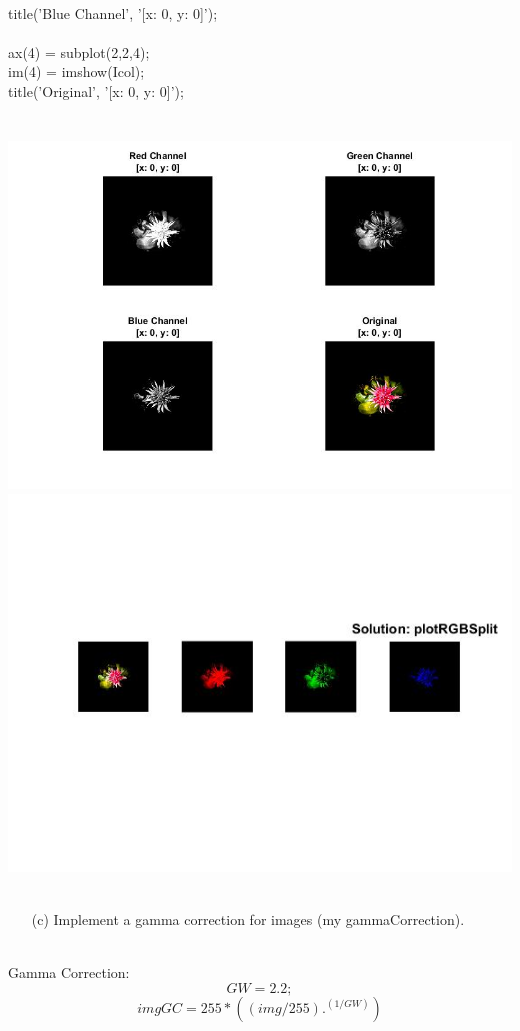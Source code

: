         \\ title({'Blue Channel', '[x: 0, y: 0]'});
        \\
        \\ ax(4) = subplot(2,2,4);
        \\ im(4) = imshow(Icol);
        \\ title({'Original', '[x: 0, y: 0]'});
        \\\\\
        \includegraphics[scale=0.58]{images/SolutionSecPart.jpg} 
        \\
        \includegraphics[scale=0.6]{images/SolutionThreethPart.jpg} 
        \\\\
    \begin{enumerate}        
        \item[(c)] Implement a gamma correction for images (my gammaCorrection).
        \\
    \end{enumerate}
        \\
        Gamma Correction:
        $$ GW = 2.2;$$
        $$ imgGC = 255*((img/255).^(1/GW))$$
     
